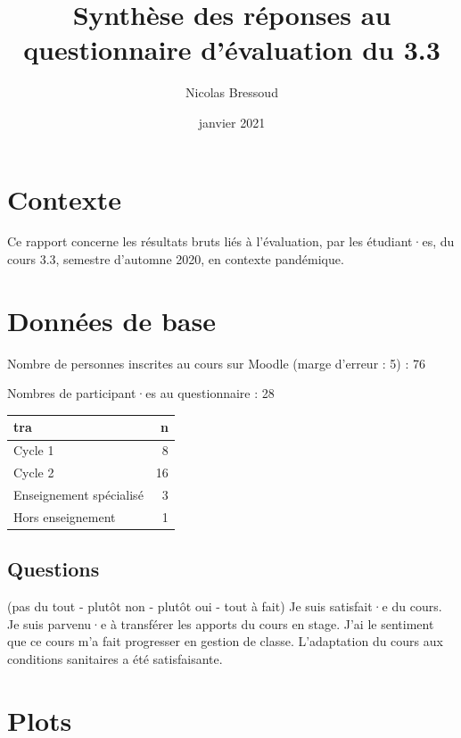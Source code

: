 \documentclass[
  french,
]{article}
\title{Synthèse des réponses au questionnaire d'évaluation du 3.3}
\author{Nicolas Bressoud}
\date{janvier 2021}
\begin{document}
\maketitle

\renewcommand*\contentsname{Table des matières}
{
\setcounter{tocdepth}{2}
\tableofcontents
}
\hypertarget{contexte}{%
\section{Contexte}\label{contexte}}

Ce rapport concerne les résultats bruts liés à l'évaluation, par les étudiant·es, du cours 3.3, semestre d'automne 2020, en contexte pandémique.

\hypertarget{donnuxe9es-de-base}{%
\section{Données de base}\label{donnuxe9es-de-base}}

Nombre de personnes inscrites au cours sur Moodle (marge d'erreur : 5) : 76

Nombres de participant·es au questionnaire : 28

\begin{tabular}{l|r}
\hline
tra & n\\
\hline
Cycle 1 & 8\\
\hline
Cycle 2 & 16\\
\hline
Enseignement spécialisé & 3\\
\hline
Hors enseignement & 1\\
\hline
\end{tabular}

\hypertarget{questions}{%
\subsection{Questions}\label{questions}}

(pas du tout - plutôt non - plutôt oui - tout à fait)
Je suis satisfait·e du cours.
Je suis parvenu·e à transférer les apports du cours en stage.
J'ai le sentiment que ce cours m'a fait progresser en gestion de classe.
L'adaptation du cours aux conditions sanitaires a été satisfaisante.

\hypertarget{plots}{%
\section{Plots}\label{plots}}
\end{document}
